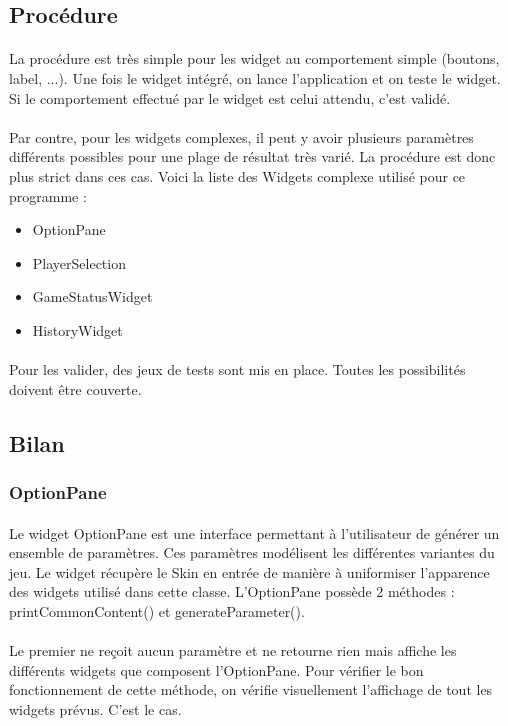 \documentclass[11pt]{article} %
\begin{document}
\subsection{Procédure}
\paragraph{}
La procédure est très simple pour les widget au comportement simple (boutons, label, ...). Une fois le widget intégré, on lance l'application et on teste le widget. Si le comportement effectué par le widget est celui attendu, c'est validé.
\paragraph{}
Par contre, pour les widgets complexes, il peut y avoir plusieurs paramètres différents possibles pour une plage de résultat très varié. La procédure est donc plus strict dans ces cas. Voici la liste des Widgets complexe utilisé pour ce programme :
\begin{itemize}
\item OptionPane
\item PlayerSelection
\item GameStatusWidget
\item HistoryWidget
\end{itemize}
\paragraph{}
Pour les valider, des jeux de tests sont mis en place. Toutes les possibilités doivent être couverte.

\subsection{Bilan}
\subsubsection{OptionPane}
\paragraph{}
Le widget OptionPane est une interface permettant à l'utilisateur de générer un ensemble de paramètres. Ces paramètres modélisent les différentes variantes du jeu. Le widget récupère le Skin en entrée de manière à uniformiser l'apparence des widgets utilisé dans cette classe. L'OptionPane possède 2 méthodes : printCommonContent() et generateParameter().
\paragraph{}
Le premier ne reçoit aucun paramètre et ne retourne rien mais affiche les différents widgets que composent l'OptionPane. Pour vérifier le bon fonctionnement de cette méthode, on vérifie visuellement l'affichage de tout les widgets prévus. C'est le cas.
\end{document}
